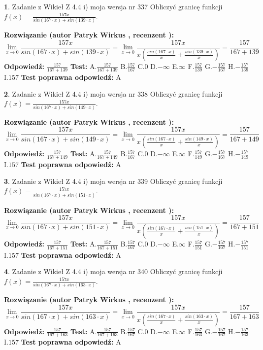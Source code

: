 \documentclass[12pt, a4paper]{article}
\theoremstyle{definition} %
\newtheorem{zad}{}
\newcommand{\zadStart}[1]{\begin{zad}#1\newline}
\newcommand{\zadStop}{\end{zad}}
\newcommand{\rozwStart}[2]{\noindent \textbf{Rozwiązanie (autor #1 , recenzent #2): }\newline}
\newcommand{\rozwStop}{\newline}
\newcommand{\odpStart}{\noindent \textbf{Odpowiedź:}\newline}
\newcommand{\odpStop}{\newline}
\newcommand{\testStart}{\noindent \textbf{Test:}\newline}
\newcommand{\testStop}{\newline}
\newcommand{\kluczStart}{\noindent \textbf{Test poprawna odpowiedź:}\newline}
\newcommand{\kluczStop}{\newline}
\begin{document}
\zadStart{Zadanie z Wikieł Z 4.4 i) moja wersja nr 337}
Obliczyć granicę funkcji $f(x)=\frac{157x}{sin(167\cdot x) +sin(139\cdot x)}$.
\zadStop
\rozwStart{Patryk Wirkus}{}
$$\lim\limits_{x\to 0}\frac{157x}{sin(167\cdot x) +sin(139\cdot x)}=\lim\limits_{x\to 0}\frac{157x}{x(\frac{sin(167\cdot x)}{x}+\frac{sin(139\cdot x)}{x})}=\frac{157}{167+139}$$
\rozwStop
\odpStart
$\frac{157}{167+139}$
\odpStop
\testStart
A.$\frac{157}{167+139}$
B.$\frac{157}{167}$
C.$0$
D.$-\infty$
E.$\infty$
F.$\frac{157}{139}$
G.$-\frac{157}{167}$
H.$-\frac{157}{139}$
I.$157$
\testStop
\kluczStart
A
\kluczStop



\zadStart{Zadanie z Wikieł Z 4.4 i) moja wersja nr 338}
Obliczyć granicę funkcji $f(x)=\frac{157x}{sin(167\cdot x) +sin(149\cdot x)}$.
\zadStop
\rozwStart{Patryk Wirkus}{}
$$\lim\limits_{x\to 0}\frac{157x}{sin(167\cdot x) +sin(149\cdot x)}=\lim\limits_{x\to 0}\frac{157x}{x(\frac{sin(167\cdot x)}{x}+\frac{sin(149\cdot x)}{x})}=\frac{157}{167+149}$$
\rozwStop
\odpStart
$\frac{157}{167+149}$
\odpStop
\testStart
A.$\frac{157}{167+149}$
B.$\frac{157}{167}$
C.$0$
D.$-\infty$
E.$\infty$
F.$\frac{157}{149}$
G.$-\frac{157}{167}$
H.$-\frac{157}{149}$
I.$157$
\testStop
\kluczStart
A
\kluczStop



\zadStart{Zadanie z Wikieł Z 4.4 i) moja wersja nr 339}
Obliczyć granicę funkcji $f(x)=\frac{157x}{sin(167\cdot x) +sin(151\cdot x)}$.
\zadStop
\rozwStart{Patryk Wirkus}{}
$$\lim\limits_{x\to 0}\frac{157x}{sin(167\cdot x) +sin(151\cdot x)}=\lim\limits_{x\to 0}\frac{157x}{x(\frac{sin(167\cdot x)}{x}+\frac{sin(151\cdot x)}{x})}=\frac{157}{167+151}$$
\rozwStop
\odpStart
$\frac{157}{167+151}$
\odpStop
\testStart
A.$\frac{157}{167+151}$
B.$\frac{157}{167}$
C.$0$
D.$-\infty$
E.$\infty$
F.$\frac{157}{151}$
G.$-\frac{157}{167}$
H.$-\frac{157}{151}$
I.$157$
\testStop
\kluczStart
A
\kluczStop



\zadStart{Zadanie z Wikieł Z 4.4 i) moja wersja nr 340}
Obliczyć granicę funkcji $f(x)=\frac{157x}{sin(167\cdot x) +sin(163\cdot x)}$.
\zadStop
\rozwStart{Patryk Wirkus}{}
$$\lim\limits_{x\to 0}\frac{157x}{sin(167\cdot x) +sin(163\cdot x)}=\lim\limits_{x\to 0}\frac{157x}{x(\frac{sin(167\cdot x)}{x}+\frac{sin(163\cdot x)}{x})}=\frac{157}{167+163}$$
\rozwStop
\odpStart
$\frac{157}{167+163}$
\odpStop
\testStart
A.$\frac{157}{167+163}$
B.$\frac{157}{167}$
C.$0$
D.$-\infty$
E.$\infty$
F.$\frac{157}{163}$
G.$-\frac{157}{167}$
H.$-\frac{157}{163}$
I.$157$
\testStop
\kluczStart
A
\kluczStop
\end{document}
